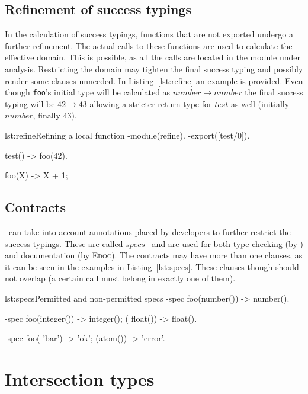 \subsection{Refinement of success typings}

In the calculation of success typings, functions that are not
exported undergo a further refinement. The actual calls to these
functions are used to calculate the effective domain. This is
possible, as all the calls are located in the module under
analysis. Restricting the domain may tighten the final success typing
and possibly render some clauses unneeded. In Listing~\ref{lst:refine}
an example is provided. Even though \texttt{foo}'s initial type will be
calculated as $number \rightarrow number$ the final success typing
will be $42 \rightarrow 43$ allowing a stricter return type for $test$
as well (initially $number$, finally $43$).

\begin{console}{lst:refine}{Refining a local function}
-module(refine).
-export([test/0]).

test() ->
  foo(42).

foo(X) -> X + 1;
\end{console}

\subsection{Contracts}

\dr\ can take into account annotations placed by developers to further
restrict the success typings. These are called
$specs$~\cite{type_system} and are used for both type checking (by
\dr) and documentation (by \mbox{\textsc{Edoc}}). The contracts may
have more than one clauses, as it can be seen in the examples in
Listing~\ref{lst:specs}. These clauses though should not overlap (a
certain call must belong in exactly one of them).

\begin{console}{lst:specs}{Permitted and non-permitted specs}
-spec foo(number()) -> number().

-spec foo(integer()) -> integer();
         (  float()) -> float().

-spec foo( 'bar') -> 'ok';
         (atom()) -> 'error'.
\end{console}

\section{Intersection types}
\label{sct:intersection_preliminaries}

